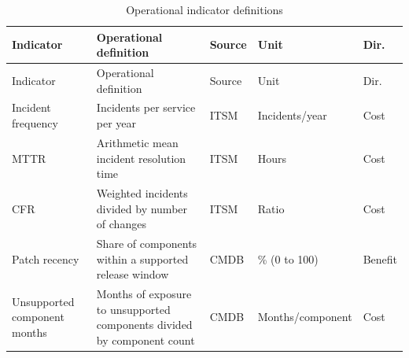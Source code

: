 \documentclass[
  authoryear,
  preprint]{elsarticle}
\begin{document}
\begin{longtable}[]{@{}
  >{\raggedright\arraybackslash}p{}
  >{\raggedright\arraybackslash}p{}
  >{\raggedright\arraybackslash}p{}
  >{\raggedright\arraybackslash}p{}
  >{\raggedright\arraybackslash}p{}@{}}
\caption{Operational indicator
definitions}\label{tbl-indicators-def}\tabularnewline
\toprule\noalign{}
\begin{minipage}[b]{\linewidth}\raggedright
Indicator
\end{minipage} & \begin{minipage}[b]{\linewidth}\raggedright
Operational definition
\end{minipage} & \begin{minipage}[b]{\linewidth}\raggedright
Source
\end{minipage} & \begin{minipage}[b]{\linewidth}\raggedright
Unit
\end{minipage} & \begin{minipage}[b]{\linewidth}\raggedright
Dir.
\end{minipage} \\
\midrule\noalign{}
\endfirsthead
\toprule\noalign{}
\begin{minipage}[b]{\linewidth}\raggedright
Indicator
\end{minipage} & \begin{minipage}[b]{\linewidth}\raggedright
Operational definition
\end{minipage} & \begin{minipage}[b]{\linewidth}\raggedright
Source
\end{minipage} & \begin{minipage}[b]{\linewidth}\raggedright
Unit
\end{minipage} & \begin{minipage}[b]{\linewidth}\raggedright
Dir.
\end{minipage} \\
\midrule\noalign{}
\endhead
\bottomrule\noalign{}
\endlastfoot
Incident frequency & Incidents per service per year & ITSM &
Incidents/year & Cost \\
MTTR & Arithmetic mean incident resolution time & ITSM & Hours & Cost \\
CFR & Weighted incidents divided by number of changes & ITSM & Ratio &
Cost \\
Patch recency & Share of components within a supported release window &
CMDB & \% (0 to 100) & Benefit \\
Unsupported component months & Months of exposure to unsupported
components divided by component count & CMDB & Months/component &
Cost \\
\end{longtable}
\end{document}
